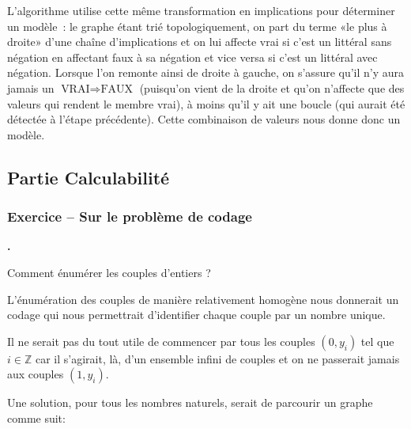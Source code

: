 \documentclass{article}
\newcounter{exocount}
\newcounter{enoncecount}
\newenvironment{enonce}
{
\stepcounter{enoncecount}
\bf\small \arabic{enoncecount}.
\begin{bf}
}
{
\end{bf}
}
\begin{document}
L'algorithme utilise cette même transformation en implications pour déterminer un modèle~: le graphe étant trié topologiquement, on part du
terme «le plus à droite» d'une chaîne d'implications et on lui affecte vrai si c'est un littéral sans négation en affectant faux à sa
négation et vice versa si c'est un littéral avec négation. Lorsque l'on remonte ainsi de droite à gauche, on s'assure qu'il n'y aura jamais un
$\text{VRAI} \Rightarrow \text{FAUX}$ (puisqu'on vient de la droite et qu'on n'affecte que des valeurs qui rendent le membre vrai), à moins
qu'il y ait une boucle (qui aurait été détectée à l'étape précédente). Cette combinaison de valeurs nous donne donc un modèle.

\subsection{Partie Calculabilité}

\subsubsection*{Exercice \bf\small {} -- Sur le problème de codage}
\setcounter{enoncecount}{0}

\begin{enonce}
Comment énumérer les couples d'entiers ?
\end{enonce}


L'énumération des couples de manière relativement homogène nous donnerait un codage qui nous permettrait d'identifier chaque couple par un nombre unique. 

Il ne serait pas du tout utile de commencer par tous les couples $(0,y_{i})$  tel que $i \in \mathbb{Z}$ car il s'agirait, là, d'un ensemble infini de couples et on ne passerait jamais aux couples $(1, y_{i})$. 

Une solution, pour tous les nombres naturels, serait de parcourir un graphe comme suit:
\end{document}
